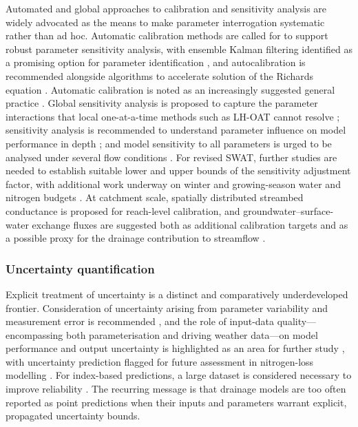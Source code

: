 \documentclass[11pt]{article}
\begin{document}
Automated and global approaches to calibration and sensitivity analysis are widely advocated as the means to make parameter interrogation systematic rather than ad hoc. Automatic calibration methods are called for to support robust parameter sensitivity analysis, with ensemble Kalman filtering identified as a promising option for parameter identification \parencite{Warsta2014}, and autocalibration is recommended alongside algorithms to accelerate solution of the Richards equation \parencite{Sadhukhan2019b}. Automatic calibration is noted as an increasingly suggested general practice \parencite{Singh2019b}. Global sensitivity analysis is proposed to capture the parameter interactions that local one-at-a-time methods such as LH-OAT cannot resolve \parencite{Timalsina2023}; sensitivity analysis is recommended to understand parameter influence on model performance in depth \parencite{Chelil2022}; and model sensitivity to all parameters is urged to be analysed under several flow conditions \parencite{Kacimov2000}. For revised SWAT, further studies are needed to establish suitable lower and upper bounds of the sensitivity adjustment factor, with additional work underway on winter and growing-season water and nitrogen budgets \parencite{Moriasi2013b}. At catchment scale, spatially distributed streambed conductance is proposed for reach-level calibration, and groundwater--surface-water exchange fluxes are suggested both as additional calibration targets and as a possible proxy for the drainage contribution to streamflow \parencite{Karan2021}.

\subsubsection{Uncertainty quantification}

Explicit treatment of uncertainty is a distinct and comparatively underdeveloped frontier. Consideration of uncertainty arising from parameter variability and measurement error is recommended \parencite{Alzraiee2013b}, and the role of input-data quality---encompassing both parameterisation and driving weather data---on model performance and output uncertainty is highlighted as an area for further study \parencite{Upadhyay2019}, with uncertainty prediction flagged for future assessment in nitrogen-loss modelling \parencite{Tao2021}. For index-based predictions, a large dataset is considered necessary to improve reliability \parencite{Beauchemin2003}. The recurring message is that drainage models are too often reported as point predictions when their inputs and parameters warrant explicit, propagated uncertainty bounds.
\end{document}
